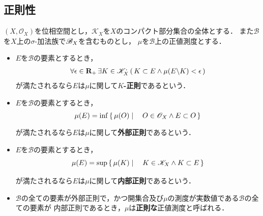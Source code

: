\subsection{正則性}
		\begin{screen}
			\begin{dfn}[正値測度の正則性]
				$(X,\mathscr{O}_X)$を位相空間とし，$\mathscr{K}_X$を$X$のコンパクト部分集合の全体とする．
				また$\mathcal{B}$を$X$上の$\sigma$-加法族で$\mathscr{B}_{X}$を含むものとし，
				$\mu$を$\mathcal{B}$上の正値測度とする．
				\begin{itemize}
					\item $E$を$\mathcal{B}$の要素とするとき，
						\begin{align}
							\forall \epsilon \in \mathbf{R}_+\, \exists K \in \mathscr{K}_X^,
							\left(\, K \subset E \wedge \mu(E \backslash K) < \epsilon\, \right)
						\end{align}
						が満たされるなら$E$は$\mu$に関して{\bf $K$-正則}であるという．
						
					\item $E$を$\mathcal{B}$の要素とするとき，
						\begin{align}
							\mu(E) = \operatorname*{inf}_{} \left\{\, \mu(O) \mid \quad O \in \mathscr{O}_X \wedge E \subset O\, \right\}
						\end{align}
						が満たされるなら$E$は$\mu$に関して{\bf 外部正則}であるという．
						
					\item $E$を$\mathcal{B}$の要素とするとき，
						\begin{align}
							\mu(E) = \operatorname*{sup}_{} \left\{\, \mu(K) \mid \quad K \in \mathscr{K}_X \wedge K \subset E\, \right\}
						\end{align}
						が満たされるなら$E$は$\mu$に関して{\bf 内部正則}であるという．
					
					\item $\mathcal{B}$の全ての要素が外部正則で，かつ開集合及び$\mu$の測度が実数値である$\mathcal{B}$の全ての要素が
						内部正則であるとき，$\mu$は{\bf 正則な}正値測度と呼ばれる．
				\end{itemize}
			\end{dfn}
		\end{screen}
		
		\begin{screen}
			\begin{thm}[$C_c$上のRieszの表現定理]
			\end{thm}
		\end{screen}
		
